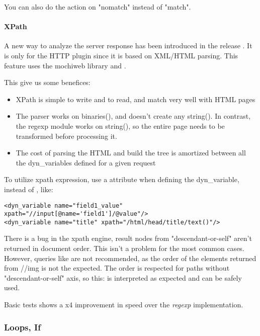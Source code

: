 \documentclass{TSUNG-en}
\begin{document}
You can also do the action on "nomatch" instead of "match".

\paragraph{XPath}

A new way to analyze the server response has been introduced in the
release . It is only for the HTTP plugin since it is
based on XML/HTML parsing. This feature uses the mochiweb library
and .

This give us some benefices:

\begin{itemize}
\item XPath is simple to write and to read, and match very well with
  HTML pages
\item The parser works on binaries(), and doesn't create any
  string(). In contrast, the regexp module works on string(), so the
  entire page needs to be  transformed before
  processing it.
\item The cost of parsing the HTML and build the tree is amortized
  between all the dyn\_variables defined for a given request
\end{itemize}

To utilize xpath expression, use a  attribute when
defining the dyn\_variable, instead of , like:
\begin{Verbatim}
<dyn_variable name="field1_value" xpath="//input[@name='field1']/@value"/>
<dyn_variable name="title" xpath="/html/head/title/text()"/>
\end{Verbatim}

There is a bug in the xpath engine, result nodes from "descendant-or-self" aren't returned in document order. This isn't a problem for the most common cases.
However, queries like  are not recommended, as the order of the  elements returned from //img is not the expected.
The order is respected for paths without "descendant-or-self" axis, so this:  is interpreted as expected and can be safely used.

Basic tests shows a x4 improvement in speed over the \emph{regexp} implementation.

\subsubsection{Loops, If}
\end{document}
